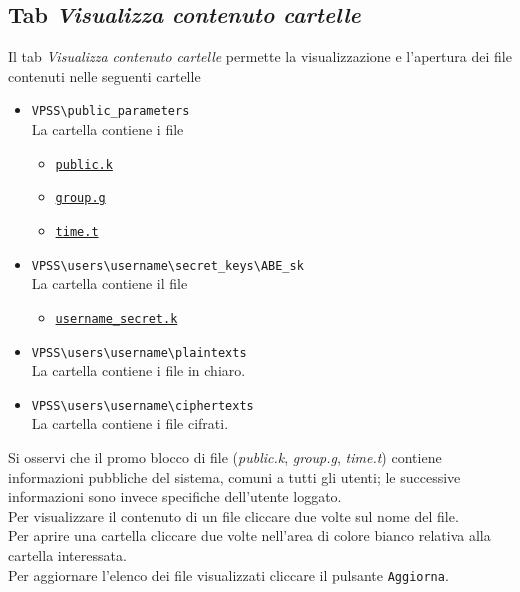 \documentclass[a4paper,twoside,10pt,openany]{scrbook}
\begin{document}
\subsection{Tab \emph{Visualizza contenuto cartelle}}\label{sec:tab_visualizza}
%
Il tab \emph{Visualizza contenuto cartelle} permette la visualizzazione e l'apertura dei file contenuti nelle seguenti cartelle
\begin{itemize}
 \item \texttt{VPSS\textbackslash public\_parameters}\\
       La cartella contiene i file
       \begin{itemize}
        \item \texttt{\hyperref[sec:format_pk]{public.k}}
        \item \texttt{\hyperref[sec:format_ec]{group.g}}
        \item \texttt{\hyperref[sec:format_time]{time.t}}
       \end{itemize}
 \item \texttt{VPSS\textbackslash users\textbackslash username\textbackslash secret\_keys\textbackslash ABE\_sk}\\
        La cartella contiene il file
       \begin{itemize}
        \item \texttt{\hyperref[sec:format_sk]{username\_secret.k}}
       \end{itemize}
 \item \texttt{VPSS\textbackslash users\textbackslash username\textbackslash plaintexts}\\
       La cartella contiene i file in chiaro.
 \item \texttt{VPSS\textbackslash users\textbackslash username\textbackslash ciphertexts}\\
       La cartella contiene i file cifrati.
\end{itemize}
Si osservi che il promo blocco di file (\textit{public.k}, \textit{group.g}, \textit{time.t}) contiene informazioni pubbliche del sistema, comuni a tutti gli utenti; le successive informazioni sono invece specifiche dell'utente loggato.\\
Per visualizzare il contenuto di un file cliccare due volte sul nome del file.\\
Per aprire una cartella cliccare due volte nell'area di colore bianco relativa alla cartella interessata.\\
Per aggiornare l'elenco dei file visualizzati cliccare il pulsante \texttt{Aggiorna}.
%
%
\end{document}
